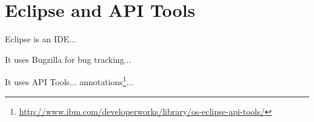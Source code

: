 \section{Eclipse and API Tools}

Eclipse is an IDE...

It uses Bugzilla for bug tracking...

It uses API Tools... annotations\footnote{\url{http://www.ibm.com/developerworks/library/os-eclipse-api-tools/}}...
